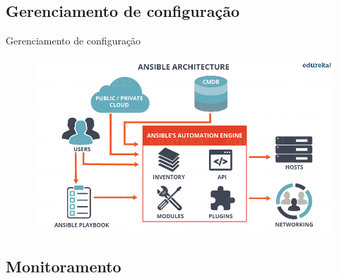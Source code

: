 \documentclass[10pt,brazil]{beamer}
\theoremstyle{definition}
\begin{document}
\subsection{Gerenciamento de configuração}

\begin{frame}{Gerenciamento de configuração}
      \begin{figure}
          \centering
      \includegraphics[width=.8\textwidth]{ansible arch.png}
          \label{fig:ansiblearch}
      \end{figure}
      
\end{frame}

\subsection{Monitoramento}
\end{document}

